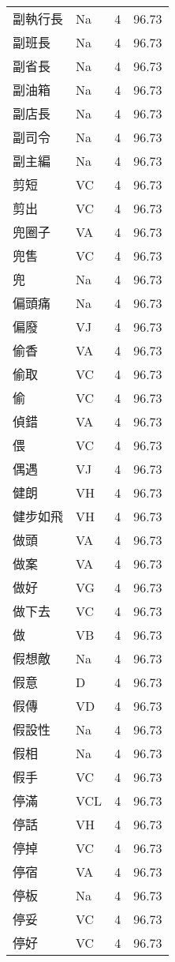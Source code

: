 \documentclass[twocolumn]{book}
\begin{document}
\begin{supertabular}{llrr}
副執行長 & Na & 4 &  96.73\\
副班長 & Na & 4 &  96.73\\
副省長 & Na & 4 &  96.73\\
副油箱 & Na & 4 &  96.73\\
副店長 & Na & 4 &  96.73\\
副司令 & Na & 4 &  96.73\\
副主編 & Na & 4 &  96.73\\
剪短 & VC & 4 &  96.73\\
剪出 & VC & 4 &  96.73\\
兜圈子 & VA & 4 &  96.73\\
兜售 & VC & 4 &  96.73\\
兜 & Na & 4 &  96.73\\
偏頭痛 & Na & 4 &  96.73\\
偏廢 & VJ & 4 &  96.73\\
偷香 & VA & 4 &  96.73\\
偷取 & VC & 4 &  96.73\\
偷 & VC & 4 &  96.73\\
偵錯 & VA & 4 &  96.73\\
偎 & VC & 4 &  96.73\\
偶遇 & VJ & 4 &  96.73\\
健朗 & VH & 4 &  96.73\\
健步如飛 & VH & 4 &  96.73\\
做頭 & VA & 4 &  96.73\\
做案 & VA & 4 &  96.73\\
做好 & VG & 4 &  96.73\\
做下去 & VC & 4 &  96.73\\
做 & VB & 4 &  96.73\\
假想敵 & Na & 4 &  96.73\\
假意 & D & 4 &  96.73\\
假傳 & VD & 4 &  96.73\\
假設性 & Na & 4 &  96.73\\
假相 & Na & 4 &  96.73\\
假手 & VC & 4 &  96.73\\
停滿 & VCL & 4 &  96.73\\
停話 & VH & 4 &  96.73\\
停掉 & VC & 4 &  96.73\\
停宿 & VA & 4 &  96.73\\
停板 & Na & 4 &  96.73\\
停妥 & VC & 4 &  96.73\\
停好 & VC & 4 &  96.73\\

\end{supertabular}
\end{document}

